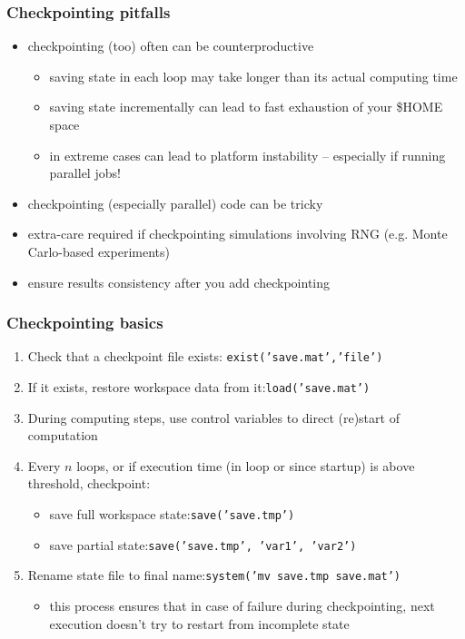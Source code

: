 \documentclass{beamer}
\begin{document}
\begin{frame}
  \frametitle{Checkpointing pitfalls}
  \begin{alertblock}{}
    \begin{itemize}
     \item checkpointing (too) often can be counterproductive
     \begin{itemize}
      \item saving state in each loop may take longer than its actual computing time
      \item saving state incrementally can lead to fast exhaustion of your \$HOME space
      \item in extreme cases can lead to platform instability -- especially if running parallel jobs!
     \end{itemize}
   \end{itemize}
   \end{alertblock}   
   \pause
   \begin{alertblock}{}
    \begin{itemize}
     \item checkpointing (especially parallel) code can be tricky
     \item extra-care required if checkpointing simulations involving RNG (e.g. Monte Carlo-based experiments)
     \item ensure results consistency after you add checkpointing
     \end{itemize}
   \end{alertblock}   
\end{frame}


\begin{frame}
  \frametitle{Checkpointing basics}
    \begin{enumerate}
     \item Check that a checkpoint file exists: \hfill {\tiny \texttt{exist('save.mat','file')}}
     \item If it exists, restore workspace data from it:\hfill {\tiny \texttt{load('save.mat')}}
     \pause
     \item During computing steps, use control variables to direct (re)start of computation
     \pause
     \item Every $n$ loops, or if execution time (in loop or since startup) is above threshold, checkpoint:
     \begin{itemize}
      \item save full workspace state:\hfill {\tiny \texttt{save('save.tmp')}}
      \item save partial state:\hfill {\tiny \texttt{save('save.tmp', 'var1', 'var2')}}
     \end{itemize}
     \pause
     \item Rename state file to final name:\hfill {\tiny \texttt{system('mv save.tmp save.mat')}}
     \begin{itemize}
      \item this process ensures that in case of failure during checkpointing, next execution doesn't try to restart from incomplete state
     \end{itemize}  
   \end{enumerate}
\end{frame}
\end{document}
